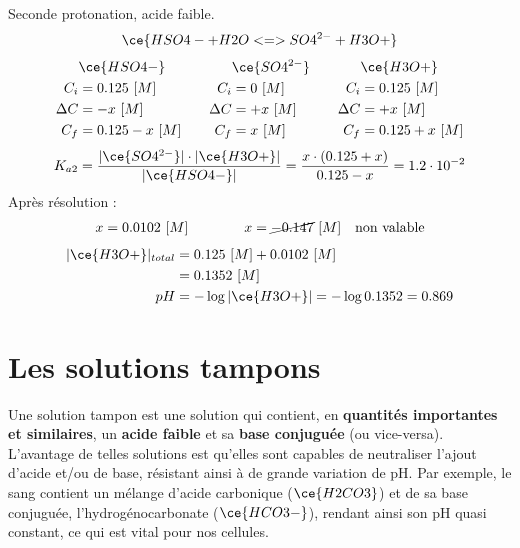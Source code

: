 \documentclass[
  11pt,
  a4paper,
  openany]{book}
\begin{document}
\begin{Answer}
Seconde protonation, acide faible.
\[
\ce{HSO4- + H2O <=> SO4^{2-} + H3O+}
\]
\[
\begin{split}
&\ce{HSO4-}\\
C_i &= 0.125\ [M] \\
\Delta C &= - x\ [M] \\
C_f &= 0.125 - x\ [M] \\
\end{split}
\qquad
\begin{split}
&\ce{SO4^{2-}}\\
C_i &= 0\ [M] \\
\Delta C &= + x\ [M] \\
C_f &= x\ [M] \\
\end{split}
\qquad
\begin{split}
&\ce{H3O+}\\
C_i &= 0.125\ [M] \\
\Delta C &= + x\ [M] \\
C_f &= 0.125 + x\ [M] \\
\end{split}
\]
\[
K_{a2} = \frac{|\ce{SO4^{2-}}| \cdot |\ce{H3O+}|}{|\ce{HSO4-}|} = \frac{x \cdot (0.125 + x)}{0.125 - x} = 1.2 \cdot 10^{-2}
\]
Après résolution :
\[
\begin{split}
x = 0.0102\ [M]
\end{split}
\qquad\qquad
\begin{split}
x = \cancel{-0.147}\ [M] \quad \text{non valable}
\end{split}
\]
\[
\begin{split}
|\ce{H3O+}|_{total} &= 0.125\ [M] + 0.0102\ [M] \\
&= 0.1352\ [M] \\
pH &= - \log |\ce{H3O+}| = - \log 0.1352 = 0.869
\end{split}
\]

\end{Answer}

\section{Les solutions tampons}\label{les-solutions-tampons}

Une solution tampon est une solution qui contient, en \textbf{quantités importantes et similaires}, un \textbf{acide faible} et sa \textbf{base conjuguée} (ou vice-versa). L'avantage de telles solutions est qu'elles sont capables de neutraliser l'ajout d'acide et/ou de base, résistant ainsi à de grande variation de pH. Par exemple, le sang contient un mélange d'acide carbonique (\(\ce{H2CO3}\)) et de sa base conjuguée, l'hydrogénocarbonate (\(\ce{HCO3-}\)), rendant ainsi son pH quasi constant, ce qui est vital pour nos cellules.
\end{document}
